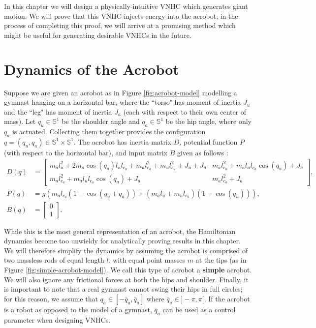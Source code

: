 In this chapter we will design a physically-intuitive VNHC which generates giant
motion. We will prove that this VNHC injects energy into the acrobot;
in the process of completing this proof, we will arrive at a promising method
which might be useful for generating desirable VNHCs in the future.

\section{Dynamics of the Acrobot}
Suppose we are given an acrobot as in Figure \ref{fig:acrobot-model} modelling a
gymnast hanging on a horizontal bar, where the ``torso" has moment of
inertia \(J_u\) and the ``leg" has moment of inertia \(J_a\) (each with respect
to their own center of mass).
Let \(q_u \in \mathbb{S}^1\) be the shoulder angle and \(q_a \in \mathbb{S}^1\) 
be the hip angle, where only \(q_a\) is actuated. 
Collecting them together provides the configuration
\(q = (q_u,q_a) \in \mathbb{S}^1 \times \mathbb{S}^1\). 
The acrobot has inertia matrix \(D\), potential function \(P\) (with respect to
the horizontal bar), and input matrix \(B\)  given as
follows \cite{xingbo_thesis}:
\begin{align}\label{eqn:general-acrobot-inertia}
    D(q) &= \begin{bmatrix}
      m_al_u^2 + 2m_a\cos(q_a)l_u l_{c_a} + m_al_{c_a}^2 + m_ul_{c_u}^2 + J_u + J_a &
      m_al_{c_a}^2 + m_al_ul_{c_a}\cos(q_a) + J_a \\
      m_al_{c_a}^2 + m_al_ul_{c_a}\cos(q_a) + J_a &
      m_al_{c_a}^2 + J_a
    \end{bmatrix} 
    , \\
    \label{eqn:general-acrobot-potential}
    P(q) &= g\left(m_al_{c_a}(1 - \cos(q_u+q_a)) + 
        (m_al_u + m_ul_{c_u})(1-\cos(q_u))\right) 
    , \\
    B(q) &= \begin{bmatrix} 0 \\ 1 \end{bmatrix}
    .
\end{align}

While this is the most general representation of an acrobot, the Hamiltonian
dynamics become too unwieldy for analytically proving results in this chapter.
We will therefore simplify the dynamics by assuming the acrobot is comprised of
two massless rods of equal length \(l\), with equal point masses \(m\) at the
tips (as in Figure \ref{fig:simple-acrobot-model}).
We call this type of acrobot a \textbf{simple} acrobot. We will also ignore any
frictional forces at both the hips and shoulder. 
Finally, it is important to note that a real gymnast cannot swing their hips in
full circles; 
for this reason, we assume that \(q_a \in [-\bar{q}_a, \bar{q}_a]\) where 
\(\bar{q}_a \in ]-\pi, \pi[\). 
If the acrobot is a robot as opposed to the model of a gymnast, 
\(\bar{q}_a\) can be used as a control parameter when designing VNHCs.

